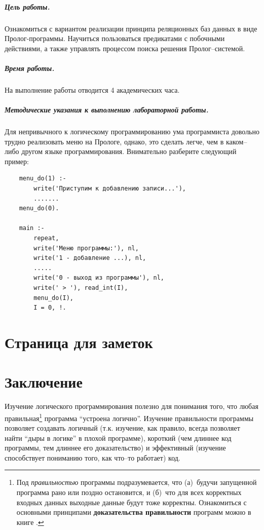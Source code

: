 \documentclass[12pt, openany, twoside]{book} %
\begin{document}
\paragraph{Цель работы.} Ознакомиться с вариантом реализации принципа
реляционных баз данных в виде Пролог-программы. Научиться пользоваться
предикатами с побочными действиями, а также управлять процессом поиска
решения Пролог--системой.

\paragraph{Время работы.} На выполнение работы отводится 4 академических
часа.

\paragraph{Методические указания к выполнению лабораторной работы.}
Для непривычного к логическому программированию
ума программиста довольно трудно реализовать
меню на Прологе, однако, это сделать легче, чем в каком--либо другом
языке программирования. Внимательно разберите следующий пример:

{\tt\begin{verbatim}
    menu_do(1) :-
        write('Приступим к добавлению записи...'),
        .......
    menu_do(0).

    main :-
        repeat,
        write('Меню программы:'), nl,
        write('1 - добавление ...), nl,
        .....
        write('0 - выход из программы'), nl,
        write(' > '), read_int(I),
        menu_do(I),
        I = 0, !.
\end{verbatim}}
\chapter*{Страница для заметок}

\chapter*{Заключение}


Изучение логического программирования полезно для понимания того, что
любая правильная\footnote{Под {\em правильностью} программы подразумевается,
что (а)~будучи запущенной программа рано или поздно остановится, и
(б)~что для всех корректных входных данных выходные данные будут
тоже корректны. Ознакомиться с основными принципами {\bf доказательства
правильности} программ можно в книге \cite{Anderson}.} программа ``устроена
логично''. Изучение правильности программы позволяет создавать логичный
(т.к. изучение, как правило, всегда позволяет найти ``дыры в логике''
в плохой программе), короткий (чем длиннее код программы, тем длиннее его
доказательство) и эффективный (изучение способствует пониманию того, как
что--то работает) код.
\end{document}
